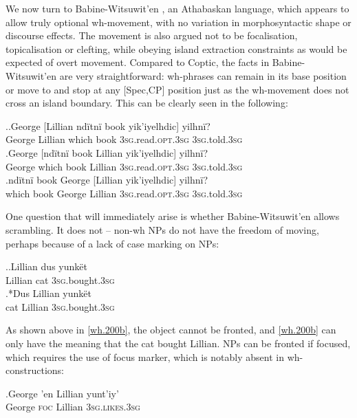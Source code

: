 \documentclass[charis]{glossa}
\begin{document}
We now turn to Babine-Witsuwit'en \citep{denham:1997, denham:00}, an Athabaskan language, which appears to allow truly optional wh-movement, with no variation in morphosyntactic shape or discourse effects. The movement is also argued not to be focalisation, topicalisation or clefting, while obeying island extraction constraints as would be expected of overt movement. Compared to Coptic, the facts in Babine-Witsuwit'en are very straightforward: wh-phrases can remain in its base position or move to and stop at any [Spec,CP] position just as the wh-movement does not cross an island boundary. This can be clearly seen in the following:

\ex.\ag.\label{wh.190a}George [Lillian nd\"itn\"i book yik'iyelhdic] yilhn\"i?\\
   George Lillian which book \textsc{3sg}.read.\textsc{opt.3sg} \textsc{3sg}.told.\textsc{3sg}\\
   \bg.\label{wh.190b}George [nd\"itn\"i book Lillian yik'iyelhdic] yilhn\"i?\\
   George which book Lillian \textsc{3sg}.read.\textsc{opt.3sg} \textsc{3sg}.told.\textsc{3sg}\\
   \bg.\label{wh.190c}nd\"itn\"i book George [Lillian yik'iyelhdic] yilhn\"i?\\
   which book George Lillian \textsc{3sg}.read.\textsc{opt.3sg} \textsc{3sg}.told.\textsc{3sg}\\

One question that will immediately arise is whether Babine-Witsuwit'en allows scrambling. It does not -- non-wh NPs do not have the freedom of moving, perhaps because of a lack of case marking on NPs:

\ex.\ag.\label{wh.200a}Lillian dus yunk\"et\\
   Lillian cat \textsc{3sg.}bought.\textsc{3sg}\\
   \bg.*\label{wh.200b}Dus Lillian yunk\"et\\
   cat Lillian \textsc{3sg.}bought.\textsc{3sg}\\

As shown above in \ref{wh.200b}, the object cannot be fronted, and \ref{wh.200b} can only have the meaning that the cat bought Lillian. NPs can be fronted if focused, which requires the use of focus marker, which is notably absent in wh-constructions:

\exg.\label{wh.210}George 'en Lillian yunt'iy'\\
   George \textsc{foc} Lillian \textsc{3sg.likes.3sg}\\
\end{document}
